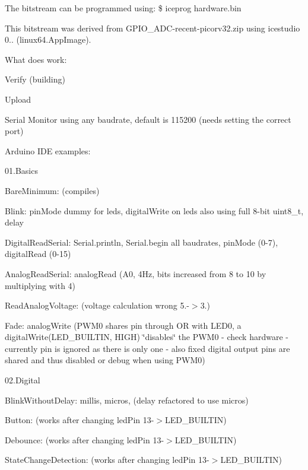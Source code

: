 The bitstream can be programmed using\-: \$ iceprog hardware.\-bin

This bitstream was derived from G\-P\-I\-O\-\_\-\-A\-D\-C-\/recent-\/picorv32.\-zip using icestudio 0.. (linux64.\-App\-Image).

What does work\-:
\begin{DoxyItemize}
\item Verify (building)
\item Upload
\item Serial Monitor using any baudrate, default is 115200 (needs setting the correct port)
\item Arduino I\-D\-E examples\-:
\begin{DoxyItemize}
\item 01.\-Basics
\begin{DoxyItemize}
\item Bare\-Minimum\-: (compiles)
\item Blink\-: pin\-Mode dummy for leds, digital\-Write on leds also using full 8-\/bit uint8\-\_\-t, delay
\item Digital\-Read\-Serial\-: Serial.\-println, Serial.\-begin all baudrates, pin\-Mode (0-\/7), digital\-Read (0-\/15)
\item Analog\-Read\-Serial\-: analog\-Read (A0, 4\-Hz, bits increased from 8 to 10 by multiplying with 4)
\item Read\-Analog\-Voltage\-: (voltage calculation wrong 5.-\/$>$3.)
\item Fade\-: analog\-Write (P\-W\-M0 shares pin through O\-R with L\-E\-D0, a digital\-Write(\-L\-E\-D\-\_\-\-B\-U\-I\-L\-T\-I\-N, H\-I\-G\-H) \char`\"{}disables\char`\"{} the P\-W\-M0 -\/ check hardware -\/ currently pin is ignored as there is only one -\/ also fixed digital output pins are shared and thus disabled or debug when using P\-W\-M0)
\end{DoxyItemize}
\item 02.\-Digital
\begin{DoxyItemize}
\item Blink\-Without\-Delay\-: millis, micros, (delay refactored to use micros)
\item Button\-: (works after changing led\-Pin 13-\/$>$L\-E\-D\-\_\-\-B\-U\-I\-L\-T\-I\-N)
\item Debounce\-: (works after changing led\-Pin 13-\/$>$L\-E\-D\-\_\-\-B\-U\-I\-L\-T\-I\-N)
\item State\-Change\-Detection\-: (works after changing led\-Pin 13-\/$>$L\-E\-D\-\_\-\-B\-U\-I\-L\-T\-I\-N)

\end{DoxyItemize}
\end{DoxyItemize}
\end{DoxyItemize}

